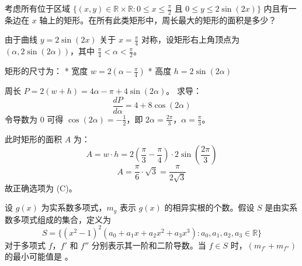 \begin{questions}

    \question
考虑所有位于区域 $\{(x,y) \in \mathbb{R} \times \mathbb{R} : 0 \le x \le \frac{\pi}{2} \text{ 且 } 0 \le y \le 2 \sin(2x)\}$ 内且有一条边在 $x$ 轴上的矩形。在所有此类矩形中，周长最大的矩形的面积是多少？

\begin{solution}
由于曲线 $y = 2 \sin(2x)$ 关于 $x = \frac{\pi}{4}$ 对称，设矩形右上角顶点为 $(\alpha, 2 \sin(2\alpha))$，其中 $\frac{\pi}{4} < \alpha < \frac{\pi}{2}$。

矩形的尺寸为：
* 宽度 $w = 2(\alpha - \frac{\pi}{4})$
* 高度 $h = 2 \sin(2\alpha)$

周长 $P = 2(w + h) = 4\alpha - \pi + 4 \sin(2\alpha)$。
求导：
\[ \frac{dP}{d\alpha} = 4 + 8 \cos(2\alpha) \]
令导数为 0 可得 $\cos(2\alpha) = -\frac{1}{2}$，即 $2\alpha = \frac{2\pi}{3}$，$\alpha = \frac{\pi}{3}$。

此时矩形的面积 $A$ 为：
\[ A = w \cdot h = 2\left(\frac{\pi}{3} - \frac{\pi}{4}\right) \cdot 2 \sin\left(\frac{2\pi}{3}\right) \]
\[ A = \frac{\pi}{6} \cdot \sqrt{3} = \frac{\pi}{2\sqrt{3}} \]
故正确选项为 (C)。
\end{solution}

\question
设 $g(x)$ 为实系数多项式，$m_g$ 表示 $g(x)$ 的相异实根的个数。假设 $S$ 是由实系数多项式组成的集合，定义为
\[
S = \{(x^2 - 1)^2(a_0 + a_1x + a_2x^2 + a_3x^3) : a_0, a_1, a_2, a_3 \in \mathbb{R}\}
\]
对于多项式 $f$，$f'$ 和 $f''$ 分别表示其一阶和二阶导数。当 $f \in S$ 时，$(m_{f'} + m_{f''})$ 的最小可能值是 \underline{\quad\quad}。


\end{questions}
